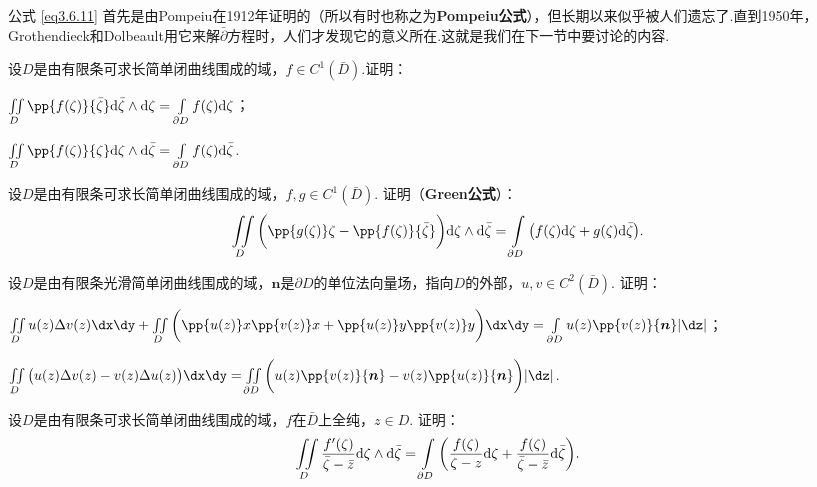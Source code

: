 公式 \eqref{eq3.6.11} 首先是由Pompeiu在1912年证明的（所以有时也称之为\textbf{Pompeiu公式}），但长期以来似乎被人们遗忘了.直到1950年，Grothendieck和Dolbeault用它来解$\bar\partial$方程时，人们才发现它的意义所在.这就是我们在下一节中要讨论的内容.
\begin{xiti}
\item 设$D$是由有限条可求长简单闭曲线围成的域，$f\in C^1(\bar D)$.证明：
\begin{enuma}
  \item $\iint\limits_D\pp{f(\zeta)}{\bar\zeta}\textrm d\bar\zeta\wedge\textrm d\zeta=\int\limits_{\partial D}f(\zeta)\textrm d\zeta$；
  \item $\iint\limits_D\pp{f(\zeta)}{\zeta}\textrm d\zeta\wedge\textrm d\bar\zeta=\int\limits_{\partial D}f(\zeta)\textrm d\bar\zeta$.
\end{enuma}
\item 设$D$是由有限条可求长简单闭曲线围成的域，$f,g\in C^1(\bar D)$. 证明（\textbf{Green公式}）：
\[\iint\limits_D\bigg(\pp{g(\zeta)}\zeta-\pp{f(\zeta)}{\bar\zeta}\bigg)
\textrm d\zeta\wedge\textrm d\bar\zeta=\int\limits_{\partial D}
\big(f(\zeta)\textrm d\zeta+g(\zeta)\textrm d\bar\zeta\big).\]
\item 设$D$是由有限条光滑简单闭曲线围成的域，$\boldsymbol n$是$\partial D$的单位法向量场，指向$D$的外部，$u,v\in C^2(\bar D)$. 证明：
\begin{enuma}
  \item $\iint\limits_Du(z)\Delta v(z)\dx\dy+\iint\limits_D\bigg(
  \pp{u(z)}x\pp{v(z)}x+\pp{u(z)}y\pp{v(z)}y\bigg)\dx\dy=\int\limits_{\partial D}
  u(z)\pp{v(z)}{\boldsymbol n}|\dz|$；
  \item $\iint\limits_D\big(u(z)\Delta v(z)-v(z)\Delta u(z)\big)\dx\dy
  =\iint\limits_{\partial D}\bigg(u(z)\pp{v(z)}{\boldsymbol n}
  -v(z)\pp{u(z)}{\boldsymbol n}\bigg)|\dz|$.
\end{enuma}
\item 设$D$是由有限条可求长简单闭曲线围成的域，$f$在$\bar D$上全纯，$z\in D$. 证明：
\[\iint\limits_D\frac{f'(\zeta)}{\bar\zeta-\bar z}\textrm d\zeta\wedge\textrm d\bar\zeta
=\int\limits_{\partial D}\bigg(\frac{f(\zeta)}{\zeta-z}\textrm d\zeta+\frac{f(\zeta)}{\bar \zeta-\bar z}\textrm d\bar\zeta\bigg).\]
\end{xiti}

